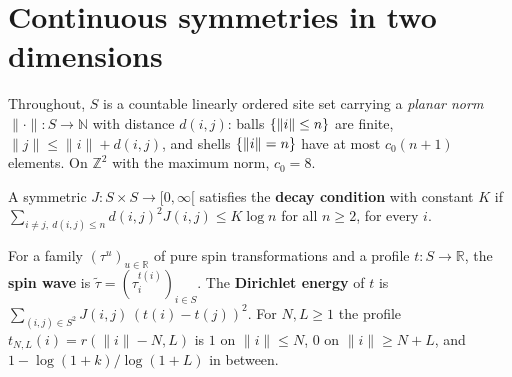\section{Continuous symmetries in two dimensions}

Throughout, $S$ is a countable linearly ordered site set carrying a \emph{planar norm}
$\|\cdot\| \colon S \to \mathbb N$ with distance $d(i,j)$: balls $\left\{ \|i\| \leq n \right\}$ are finite,
$\|j\| \leq \|i\| + d(i,j)$, and shells $\left\{ \|i\| = n \right\}$ have at most $c_0 (n+1)$ elements. On
$\mathbb Z^2$ with the maximum norm, $c_0 = 8$.

\begin{definition}
    \label{def:cs-log-decay}
    \leanok

    A symmetric $J \colon S \times S \to [0,\infty[$ satisfies the \textbf{decay condition} with
    constant $K$ if $\sum_{i \neq j,\ d(i,j) \leq n} d(i,j)^2 J(i,j) \leq K \log n$ for all
    $n \geq 2$, for every $i$.
\end{definition}

\begin{definition}
    \label{def:cs-spin-wave}
    \leanok

    For a family $(\tau^u)_{u \in \mathbb R}$ of pure spin transformations and a profile
    $t \colon S \to \mathbb R$, the \textbf{spin wave} is $\tilde\tau = (\tau_i^{t(i)})_{i \in S}$.
    The \textbf{Dirichlet energy} of $t$ is $\sum_{(i,j) \in S^2} J(i,j)\,(t(i) - t(j))^2$. For
    $N, L \geq 1$ the profile $t_{N,L}(i) = r(\|i\| - N, L)$ is $1$ on $\|i\| \leq N$, $0$ on
    $\|i\| \geq N + L$, and $1 - \log(1+k)/\log(1+L)$ in between.
\end{definition}

